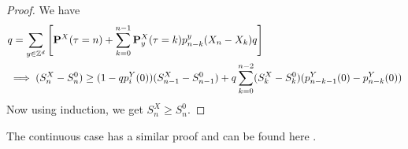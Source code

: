 \documentclass[main]{subfiles}
\begin{document}
\begin{proof}
    We have \begin{equation*}
        \begin{aligned}
             & q= \sum_{y\in\mathbb{Z}^d} \left[\P^X(\tau=n)+\sum_{k=0}^{n-1}\P^X_y(\tau=k)p_{n-k}^y(X_n-X_k)q\right]                       \\
             & \implies (S_n^X-S_n^0) \geq (1- qp_i^Y(0))(S_{n-1}^X-S_{n-1}^0)+ q\sum_{k=0}^{n-2}(S_k^X-S_k^0)(p_{n-k-1}^Y(0)-p_{n-k}^Y(0))
        \end{aligned}
    \end{equation*}
    Now using induction, we get $S_n^X\geq S_n^0.$

\end{proof}
\begin{remark}
    The continuous case has a similar proof and can be found here \cite{drewitz2011survival}.
\end{remark}
\end{document}
